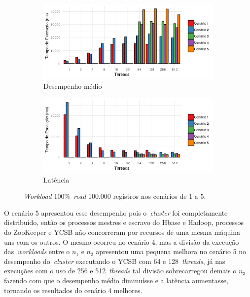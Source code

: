 \documentclass[12pt]{article}
\begin{document}
\begin{figure}
    \centering
    \begin{subfigure}[b]{0.49\textwidth}   
        \centering 
        \includegraphics[width=\textwidth]{images/figura13}
        \caption{Desempenho médio}
        \label{figura13}
    \end{subfigure}
    \begin{subfigure}[b]{0.49\textwidth}   
        \centering 
        \includegraphics[width=\textwidth]{images/figura14}
        \caption{Latência}
        \label{figura14}
    \end{subfigure}
    \caption{\emph{Workload} 100\%~\emph{read} 100.000 registros nos cenários de 1 a 5.}
\end{figure}

O cenário 5 apresentou esse desempenho pois o~\emph{cluster} foi completamente distribuído, então os processos mestres e escravo do Hbase e Hadoop, processos do ZooKeeper e YCSB não concorreram por recursos de uma mesma máquina uns com os outros. O mesmo ocorreu no cenário 4, mas a divisão da execução das~\emph{workloads} entre o $n_1$ e $n_2$ apresentou uma pequena melhora no cenário 5 no desempenho do~\emph{cluster} executando o YCSB com 64 e 128~\emph{threads}, já nas execuções com o uso de 256 e 512~\emph{threads} tal divisão sobrecarregou demais o $n_3$ fazendo com que o desempenho médio diminuísse e a latência aumentasse, tornando os resultados do cenário 4 melhores.
\end{document}
